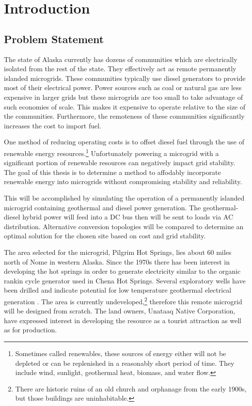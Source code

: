 \chapter{Introduction}
\label{ch:intro}

\section{Problem Statement}
The state of Alaska currently has dozens of communities which are electrically isolated from the rest of the state. They effectively act as remote permanently islanded microgrids. These communities typically use diesel generators to provide most of their electrical power. Power sources such as coal or natural gas are less expensive in larger grids but these microgrids are too small to take advantage of such economies of scale. This makes it expensive to operate relative to the size of the communities. Furthermore, the remoteness of these communities significantly increases the cost to import fuel.

One method of reducing operating costs is to offset diesel fuel through the use of renewable energy resources.\footnote{Sometimes called renewables, these sources of energy either will not be depleted or can be replenished in a reasonably short period of time. They include wind, sunlight, geothermal heat, biomass, and water flow.} Unfortunately powering a microgrid with a significant portion of renewable resources can negatively impact grid stability. The goal of this thesis is to determine a method to affodably incorporate renewable energy into microgrids without compromising stability and reliability. 

This will be accomplished by simulating the operation of a permanently islanded microgrid containing geothermal and diesel power generation. The geo\-ther\-mal\--die\-sel hybrid power will feed into a DC bus then will be sent to loads via AC distribution. Alternative conversion topologies will be compared to determine an optimal solution for the chosen site based on cost and grid stability.

The area selected for the microgrid, Pilgrim Hot Springs, lies about 60 miles north of Nome in western Alaska. Since the 1970s there has been interest in developing the hot springs in order to generate electricity similar to the organic rankin cycle generator used in Chena Hot Springs. Several exploratory wells have been drilled and indicate potential for low temperature geothermal electrical generation \cite{Holdmann2013}. The area is currently undeveloped,\footnote{There are historic ruins of an old church and orphanage from the early 1900s, but those buildings are uninhabitable.} therefore this remote microgrid will be designed from scratch. The land owners, Unataaq Native Corporation, have expressed interest in developing the resource as a tourist attraction as well as for production.

